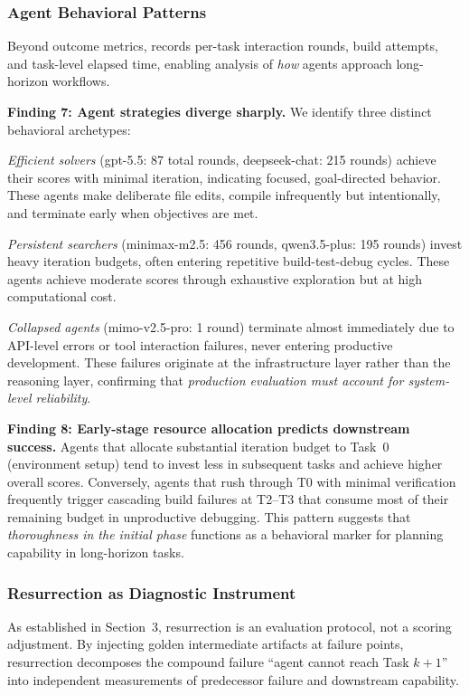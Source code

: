 \subsubsection{Agent Behavioral Patterns}

Beyond outcome metrics, \eva{} records per-task interaction rounds, build attempts, and task-level elapsed time, enabling analysis of \emph{how} agents approach long-horizon workflows.

\textbf{Finding 7: Agent strategies diverge sharply.}
We identify three distinct behavioral archetypes:

\emph{Efficient solvers} (gpt-5.5: 87 total rounds, deepseek-chat: 215 rounds) achieve their scores with minimal iteration, indicating focused, goal-directed behavior.
These agents make deliberate file edits, compile infrequently but intentionally, and terminate early when objectives are met.

\emph{Persistent searchers} (minimax-m2.5: 456 rounds, qwen3.5-plus: 195 rounds) invest heavy iteration budgets, often entering repetitive build-test-debug cycles.
These agents achieve moderate scores through exhaustive exploration but at high computational cost.

\emph{Collapsed agents} (mimo-v2.5-pro: 1 round) terminate almost immediately due to API-level errors or tool interaction failures, never entering productive development.
These failures originate at the infrastructure layer rather than the reasoning layer, confirming that \emph{production evaluation must account for system-level reliability}.

\textbf{Finding 8: Early-stage resource allocation predicts downstream success.}
Agents that allocate substantial iteration budget to Task~0 (environment setup) tend to invest less in subsequent tasks and achieve higher overall scores.
Conversely, agents that rush through T0 with minimal verification frequently trigger cascading build failures at T2--T3 that consume most of their remaining budget in unproductive debugging.
This pattern suggests that \emph{thoroughness in the initial phase} functions as a behavioral marker for planning capability in long-horizon tasks.

\subsubsection{Resurrection as Diagnostic Instrument}

As established in Section~3, resurrection is an evaluation protocol, not a scoring adjustment.
By injecting golden intermediate artifacts at failure points, resurrection decomposes the compound failure ``agent cannot reach Task $k+1$'' into independent measurements of predecessor failure and downstream capability.

